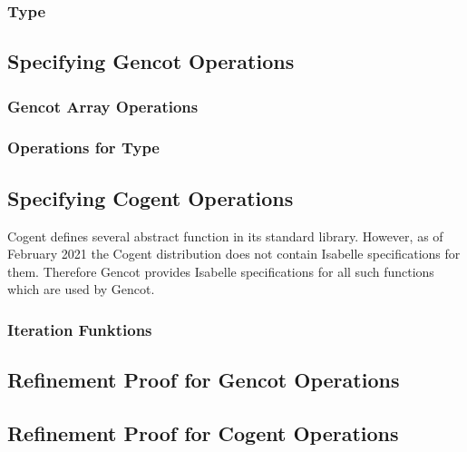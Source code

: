 \subsubsection{Type }

\subsection{Specifying Gencot Operations}
\label{design-isabelle-operations}

\subsubsection{Gencot Array Operations}

\subsubsection{Operations for Type }

\subsection{Specifying Cogent Operations}
\label{design-isabelle-cogentops}

Cogent defines several abstract function in its standard library. However, as of February 2021 the Cogent distribution
does not contain Isabelle specifications for them. Therefore Gencot provides Isabelle specifications for all such
functions which are used by Gencot.

\subsubsection{Iteration Funktions}

\subsection{Refinement Proof for Gencot Operations}
\label{design-isabelle-gencotprf}

\subsection{Refinement Proof for Cogent Operations}
\label{design-isabelle-cogentprf}
